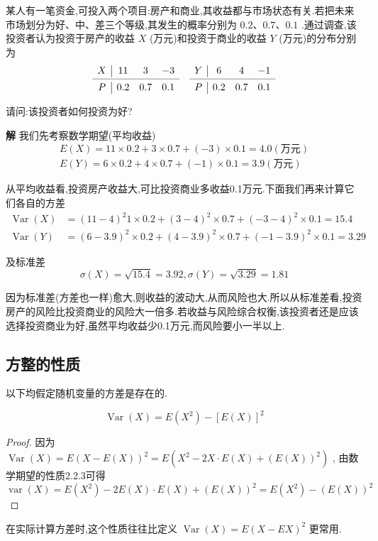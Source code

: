 \begin{example}\label{exam:2.3.2}
	某人有一笔资金,可投入两个项目:房产和商业,其收益都与市场状态有关.若把未来市场划分为好、中、差三个等级,其发生的概率分别为 $ 0.2、0.7、0.1 $ .通过调查,该投资者认为投资于房产的收益 $ X $ (万元)和投资于商业的收益 $ Y $ (万元)的分布分别为
	\[
	\begin{array}{c|ccccc|ccc}
	X     & 11    & 3     & -3    &       & Y     & 6     & 4     & -1 \\
	\cmidrule{1-4}\cmidrule{6-9}    P     & 0.2   & 0.7   & 0.1   &       & P     & 0.2   & 0.7   & 0.1 \\
	\end{array}
	\]
	
	请问:该投资者如何投资为好?
	
	\textbf{解} 我们先考察数学期望(平均收益)
	\[
	\begin{array}{c}
	{E(X)=11 \times 0.2+3 \times 0.7+(-3) \times 0.1=4.0 (\text{万元})} \\ 
	{E(Y)=6 \times 0.2+4 \times 0.7+(-1) \times 0.1=3.9(\text{万元})}
	\end{array}
	\]
	
	从平均收益看,投资房产收益大,可比投资商业多收益0.1万元.下面我们再来计算它们各自的方差
	\[
	\begin{aligned} 
	\operatorname{Var}(X) & =(11-4)^{2} 1 \times 0.2+(3-4)^{2} \times 0.7+(-3-4)^{2} \times 0.1=15.4 \\ 
	\operatorname{Var}(Y) & =(6-3.9)^{2} \times 0.2+(4-3.9)^{2} \times 0.7+(-1-3.9)^{2} \times 0.1=3.29 
	\end{aligned}
	\]
	
	及标准差
	\[
	\sigma(X)=\sqrt{15.4}=3.92, \sigma(Y)=\sqrt{3.29}=1.81
	\]
	
	因为标准差(方差也一样)愈大,则收益的波动大,从而风险也大.所以从标准差看,投资房产的风险比投资商业的风险大一倍多.若收益与风险综合权衡,该投资者还是应该选择投资商业为好,虽然平均收益少0.1万元,而风险要小一半以上.
	
\end{example}

\subsection{方整的性质}

以下均假定随机变量的方差是存在的.

\begin{property}
	\[
	\operatorname{Var}(X)=E\left(X^{2}\right)-[E(X)]^{2}
	\]
	
	\begin{proof}
		因为 $ \operatorname{Var}(X)=E(X-E(X))^{2}=E\left(X^{2}-2 X \cdot E(X)+(E(X))^{2}\right) $ , 由数学期望的性质2.2.3可得
		\[
		\operatorname{var}(X)=E\left(X^{2}\right)-2 E(X) \cdot E(X)+(E(X))^{2}=E\left(X^{2}\right)-(E(X))^{2}
		\]
		
	\end{proof}	
	
	在实际计算方差时,这个性质往往比定义 $ \operatorname{Var}(X)=E(X-E X)^{2} $ 更常用.
	
\end{property}

